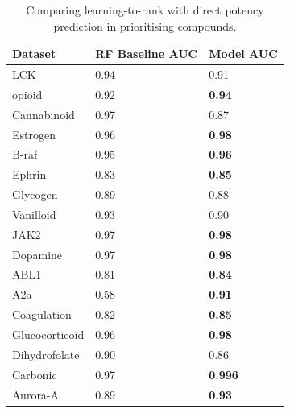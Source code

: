     
\begin{table}[]
\begin{tabular}{|l|l|l|}
\hline
\textbf{Dataset} & \textbf{RF Baseline AUC} & \textbf{Model AUC}  \\ \hline
LCK              & 0.94              & 0.91          \\ \hline
opioid           & 0.92                & \textbf{0.94} \\ \hline
Cannabinoid      & 0.97               & 0.87          \\ \hline
Estrogen         & 0.96               & \textbf{0.98} \\ \hline
B-raf            & 0.95              & \textbf{0.96} \\ \hline
Ephrin           & 0.83               & \textbf{0.85} \\ \hline
Glycogen         & 0.89             & 0.88         \\ \hline
Vanilloid        & 0.93              & 0.90          \\ \hline
JAK2             & 0.97              & \textbf{0.98} \\ \hline
Dopamine         & 0.97               & \textbf{0.98} \\ \hline
ABL1             & 0.81               & \textbf{0.84} \\ \hline
A2a              & 0.58              & \textbf{0.91} \\ \hline
Coagulation      & 0.82                & \textbf{0.85}  \\ \hline
Glucocorticoid   & 0.96             & \textbf{0.98} \\ \hline
Dihydrofolate    & 0.90               & 0.86          \\ \hline
Carbonic         & 0.97              & \textbf{0.996} \\ \hline
Aurora-A         & 0.89               & \textbf{0.93} \\ \hline
\end{tabular}
\caption{Comparing learning-to-rank with direct potency prediction in prioritising compounds.}
\label{table1}
\end{table}

